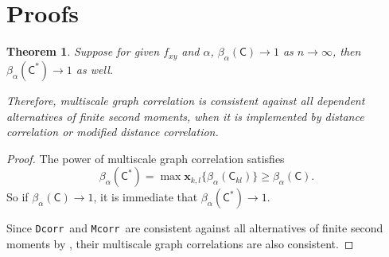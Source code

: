 \documentclass[11pt]{article}
\providecommand{\sct}[1]{{\sc \texttt{#1}}}
\providecommand{\mb}[1]{\boldsymbol{#1}}
\newcommand{\G}{\mathsf{C}}
\newcommand{\Dcorr}{\sct{Dcorr}}
\newcommand{\Mcorr}{\sct{Mcorr}}
\newcommand{\mbx}{\ensuremath{\mb{x}}}
\newtheorem{appThm}{Theorem}
\begin{document}
\section{Proofs}
\label{appen:proofs}
\begin{appThm}
Suppose for given $f_{xy}$ and $\alpha$, $\beta_{\alpha}(\G) \rightarrow 1$ as $n \rightarrow \infty$, then $\beta_{\alpha}(\G^{*}) \rightarrow 1$ as well.

Therefore, multiscale graph correlation is consistent against all dependent alternatives of finite second moments, when it is implemented by distance correlation or modified distance correlation.
\end{appThm}
\begin{proof}
The power of multiscale graph correlation satisfies
\begin{equation}
\beta_{\alpha}(\G^{*})=\max\mbx_{k,l}\{\beta_{\alpha}(\G_{kl})\} \geq \beta_{\alpha}(\G).
\end{equation}
So if $\beta_{\alpha}(\G) \rightarrow 1$, it is immediate that $\beta_{\alpha}(\G^{*}) \rightarrow 1$.

Since \Dcorr~and \Mcorr~are consistent against all alternatives of finite second moments by \cite{SzekelyRizzoBakirov2007, SzekelyRizzo2013a}, their multiscale graph correlations are also consistent.
\end{proof}
\end{document}
